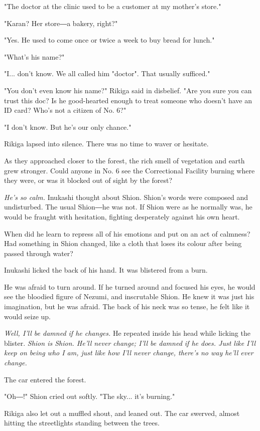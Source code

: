 "The doctor at the clinic used to be a customer at my mother's store."

"Karan? Her store―a bakery, right?"

"Yes. He used to come once or twice a week to buy bread for lunch."

"What's his name?"

"I... don't know. We all called him "doctor". That usually sufficed."

"You don't even know his name?" Rikiga said in disbelief. "Are you sure
you can trust this doc? Is he good-hearted enough to treat someone who
doesn't have an ID card? Who's not a citizen of No. 6?"

"I don't know. But he's our only chance."

Rikiga lapsed into silence. There was no time to waver or hesitate.

As they approached closer to the forest, the rich smell of vegetation
and earth grew stronger. Could anyone in No. 6 see the Correctional
Facility burning where they were, or was it blocked out of sight by the
forest?

\emph{He's so calm.} Inukashi thought about Shion. Shion's words were composed
and undisturbed. The usual Shion―he was not. If Shion were as he
normally was, he would be fraught with hesitation, fighting desperately
against his own heart.

When did he learn to repress all of his emotions and put on an act of
calmness? Had something in Shion changed, like a cloth that loses its
colour after being passed through water?

Inukashi licked the back of his hand. It was blistered from a burn.

He was afraid to turn around. If he turned around and focused his eyes,
he would see the bloodied figure of Nezumi, and inscrutable Shion. He
knew it was just his imagination, but he was afraid. The back of his
neck was so tense, he felt like it would seize up.

\emph{Well, I'll be damned if he changes.} He repeated inside his head while
licking the blister. \emph{Shion is Shion. He'll never change; I'll be damned
if he does. Just like I'll keep on being who I am, just like how I'll
never change, there's no way he'll ever change.}

The car entered the forest.

"Oh―!" Shion cried out softly. "The sky... it's burning."

Rikiga also let out a muffled shout, and leaned out. The car swerved,
almost hitting the streetlights standing between the trees.

